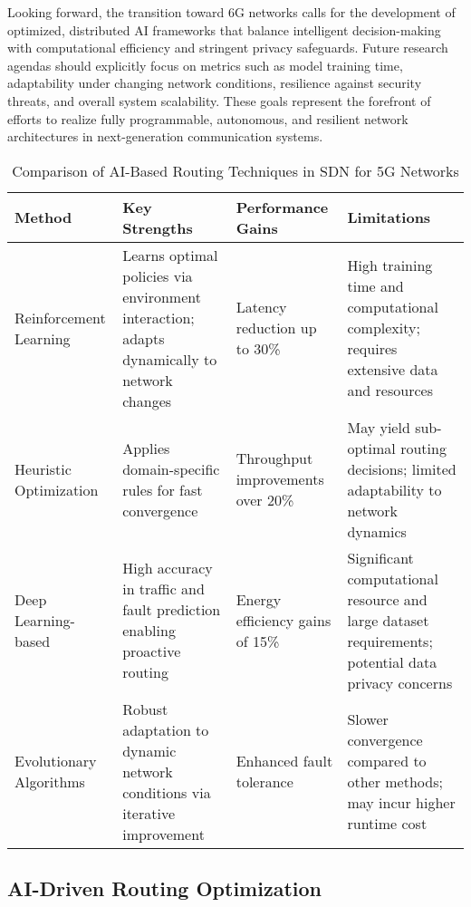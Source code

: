 \documentclass[sigconf]{acmart}
\begin{document}
Looking forward, the transition toward 6G networks calls for the development of optimized, distributed AI frameworks that balance intelligent decision-making with computational efficiency and stringent privacy safeguards. Future research agendas should explicitly focus on metrics such as model training time, adaptability under changing network conditions, resilience against security threats, and overall system scalability. These goals represent the forefront of efforts to realize fully programmable, autonomous, and resilient network architectures in next-generation communication systems.

\begin{table*}[htbp]
\centering
\caption{Comparison of AI-Based Routing Techniques in SDN for 5G Networks}
\label{tab:ai-routing-comparison}
\begin{adjustbox}{max width=\textwidth}
\begin{tabular}{@{}llll@{}}
\toprule
\textbf{Method} & \textbf{Key Strengths} & \textbf{Performance Gains} & \textbf{Limitations} \\
\midrule
Reinforcement Learning & Learns optimal policies via environment interaction; adapts dynamically to network changes & Latency reduction up to 30\% & High training time and computational complexity; requires extensive data and resources \\
Heuristic Optimization & Applies domain-specific rules for fast convergence & Throughput improvements over 20\% & May yield sub-optimal routing decisions; limited adaptability to network dynamics \\
Deep Learning-based & High accuracy in traffic and fault prediction enabling proactive routing & Energy efficiency gains of 15\% & Significant computational resource and large dataset requirements; potential data privacy concerns \\
Evolutionary Algorithms & Robust adaptation to dynamic network conditions via iterative improvement & Enhanced fault tolerance & Slower convergence compared to other methods; may incur higher runtime cost \\
\bottomrule
\end{tabular}
\end{adjustbox}
\end{table*}

\subsection{AI-Driven Routing Optimization}
\end{document}
